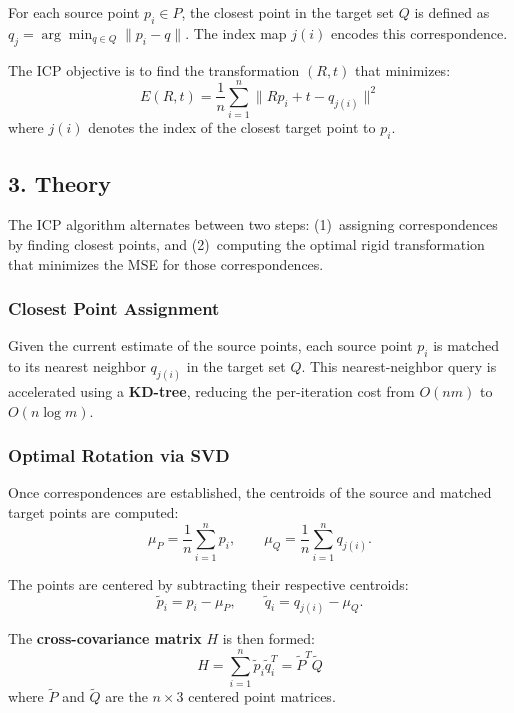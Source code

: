 \begin{definition}\label{def:closest_point_correspondence}
For each source point $p_i \in P$, the closest point in the target set $Q$ is defined as $q_j = \arg\min_{q \in Q} \|p_i - q\|$. The index map $j(i)$ encodes this correspondence.
\end{definition}

\begin{definition}\label{def:icp_mse_objective}
The ICP objective is to find the transformation $(R, t)$ that minimizes:
$$E(R, t) = \frac{1}{n} \sum_{i=1}^{n} \|R p_i + t - q_{j(i)}\|^2$$
where $j(i)$ denotes the index of the closest target point to $p_i$.
\end{definition}

\subsection{3. Theory}

The ICP algorithm alternates between two steps: (1)~assigning correspondences by finding closest points, and (2)~computing the optimal rigid transformation that minimizes the MSE for those correspondences.

\subsubsection{Closest Point Assignment}

Given the current estimate of the source points, each source point $p_i$ is matched to its nearest neighbor $q_{j(i)}$ in the target set $Q$. This nearest-neighbor query is accelerated using a \textbf{KD-tree}\cite{besl1992}, reducing the per-iteration cost from $O(nm)$ to $O(n \log m)$.

\subsubsection{Optimal Rotation via SVD}

Once correspondences are established, the centroids of the source and matched target points are computed:
$$\mu_P = \frac{1}{n}\sum_{i=1}^{n} p_i, \qquad \mu_Q = \frac{1}{n}\sum_{i=1}^{n} q_{j(i)}.$$

The points are centered by subtracting their respective centroids:
$$\tilde{p}_i = p_i - \mu_P, \qquad \tilde{q}_i = q_{j(i)} - \mu_Q.$$

The \textbf{cross-covariance matrix} $H$ is then formed:
$$H = \sum_{i=1}^{n} \tilde{p}_i \tilde{q}_i^T = \tilde{P}^T \tilde{Q}$$
where $\tilde{P}$ and $\tilde{Q}$ are the $n \times 3$ centered point matrices.

